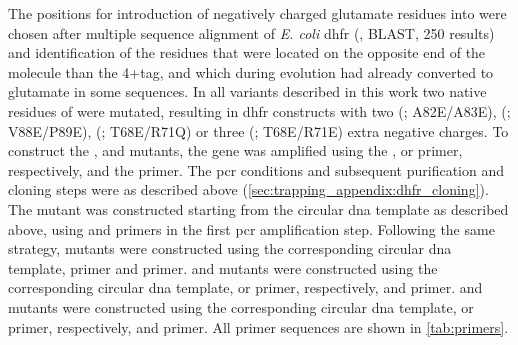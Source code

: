 The positions for introduction of negatively charged glutamate residues into  were chosen after
multiple sequence alignment of \textit{E. coli} \gls{dhfr} (, BLAST, 250 results) and
identification of the residues that were located on the opposite end of the molecule than the 4+tag, and which
during evolution had already converted to glutamate in some sequences. In all  variants described
in this work two native residues of  were mutated, resulting in \gls{dhfr} constructs with two
(; A82E/A83E), (; V88E/P89E), (; T68E/R71Q) or three (;
T68E/R71E) extra negative charges. To construct the ,  and  mutants, the
 gene was amplified using the ,  or  primer, respectively,
and the  primer. The \gls{pcr} conditions and subsequent purification and cloning steps
were as described above (\cref{sec:trapping_appendix:dhfr_cloning}). The  mutant was constructed
starting from the  circular \gls{dna} template as described above, using  and
 primers in the first \gls{pcr} amplification step. Following the same strategy,
 mutants were constructed using the corresponding  circular \gls{dna} template,
 primer and  primer.  and  mutants were
constructed using the corresponding  circular \gls{dna} template,  or  primer, respectively, and  primer.  and  mutants were
constructed using the corresponding  circular \gls{dna} template,  or  primer, respectively, and  primer. All primer sequences are shown in
\cref{tab:primers}.

